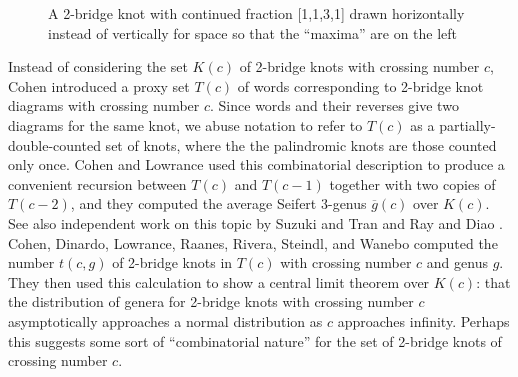 \documentclass[11pt]{amsart}
\theoremstyle{definition}
\theoremstyle{remark}
\numberwithin{equation}{section}
\begin{document}
\begin{figure}[h!]
\caption{\label{fig:knot} A 2-bridge knot with continued fraction [1,1,3,1] drawn horizontally instead of vertically for space so that the ``maxima'' are on the left}
\end{figure}



Instead of considering the set $K(c)$ of 2-bridge knots with crossing number $c$, Cohen \cite{Coh:lower} introduced a proxy set $T(c)$ of words corresponding to 2-bridge knot diagrams with crossing number $c$.  Since words and their reverses give two diagrams for the same knot, we abuse notation to refer to $T(c)$ as a partially-double-counted set of knots, where the the palindromic knots are those counted only once.  Cohen and Lowrance \cite{CohLow} used this combinatorial description to produce a convenient recursion  between $T(c)$ and $T(c-1)$ together with two copies of $T(c-2)$, and they computed the average Seifert 3-genus $\overline{g}(c)$ over $K(c)$.  See also independent work on this topic by Suzuki and Tran \cite{SuzukiTran}  and Ray and Diao \cite{RayDiao}.  
Cohen, Dinardo, Lowrance, Raanes, Rivera, Steindl, and Wanebo \cite{CohLowURSI} computed the number $t(c,g)$ of 2-bridge knots in $T(c)$ with crossing number $c$ and genus $g$.  They then used this calculation to show a central limit theorem over $K(c)$:  that the distribution of genera for 2-bridge knots with crossing number $c$ asymptotically approaches a normal distribution as $c$ approaches infinity.  Perhaps this suggests some sort of ``combinatorial nature'' for the set of 2-bridge knots of crossing number $c$.
\end{document}
